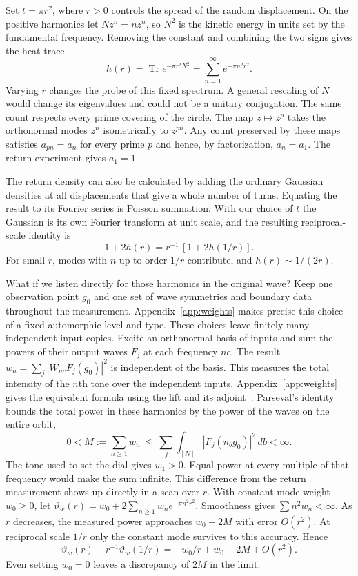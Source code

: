 \documentclass[11pt,letterpaper]{article}
\newcommand{\Tr}{\operatorname{Tr}}
\numberwithin{equation}{section}
\begin{document}
Set $t=\pi r^2$, where $r>0$ controls the spread of the random displacement. On the positive harmonics let $N z^n=n z^n$, so $N^2$ is the kinetic energy in units set by the fundamental frequency. Removing the constant and combining the two signs gives the heat trace
\begin{equation}
 h(r)=\Tr e^{-\pi r^2N^2}=\sum_{n=1}^\infty e^{-\pi n^2r^2}.
 \label{eq:heatcount}
\end{equation}
Varying $r$ changes the probe of this fixed spectrum. A general rescaling of $N$ would change its eigenvalues and could not be a unitary conjugation. The same count respects every prime covering of the circle. The map $z\mapsto z^p$ takes the orthonormal modes $z^n$ isometrically to $z^{pn}$. Any count preserved by these maps satisfies $a_{pn}=a_n$ for every prime $p$ and hence, by factorization, $a_n=a_1$. The return experiment gives $a_1=1$.

The return density can also be calculated by adding the ordinary Gaussian densities at all displacements that give a whole number of turns. Equating the result to its Fourier series is Poisson summation. With our choice of $t$ the Gaussian is its own Fourier transform at unit scale, and the resulting reciprocal-scale identity is
\[
 1+2h(r)=r^{-1}\,[1+2h(1/r)] .
\]
For small $r$, modes with $n$ up to order $1/r$ contribute, and $h(r)\sim1/(2r)$.

What if we listen directly for those harmonics in the original wave? Keep one observation point $g_0$ and one set of wave symmetries and boundary data throughout the measurement. Appendix~\ref{app:weights} makes precise this choice of a fixed automorphic level and type. These choices leave finitely many independent input copies. Excite an orthonormal basis of inputs and sum the powers of their output waves $F_j$ at each frequency $nc$. The result $w_n=\sum_j|W_{nc}F_j(g_0)|^2$ is independent of the basis. This measures the total intensity of the $n$th tone over the independent inputs. Appendix~\ref{app:weights} gives the equivalent formula using the lift and its adjoint~\cite{stagebasis}. Parseval's identity bounds the total power in these harmonics by the power of the waves on the entire orbit,
\begin{equation}
 0<M:=\sum_{n\ge1}w_n\ \le\
 \sum_j\int_{[N]}|F_j(n_b g_0)|^2\,db<\infty .
 \label{eq:power}
\end{equation}
The tone used to set the dial gives $w_1>0$. Equal power at every multiple of that frequency would make the sum infinite. This difference from the return measurement shows up directly in a scan over $r$. With constant-mode weight $w_0\ge0$, let $\vartheta_w(r)=w_0+2\sum_{n\ge1}w_ne^{-\pi n^2r^2}$. Smoothness gives $\sum n^2w_n<\infty$. As $r$ decreases, the measured power approaches $w_0+2M$ with error $O(r^2)$. At reciprocal scale $1/r$ only the constant mode survives to this accuracy. Hence
\begin{equation}
 \vartheta_w(r)-r^{-1}\vartheta_w(1/r)
    =-w_0/r+w_0+2M+O(r^2).
 \label{eq:defect}
\end{equation}
Even setting $w_0=0$ leaves a discrepancy of $2M$ in the limit.
\end{document}
